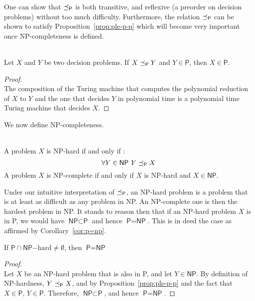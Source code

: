 One can show that \(\preceq_\textsf{P}\) is both transitive, and reflexive (a preorder on decision problems) without too much difficulty. Furthermore, the relation \(\preceq_\textsf{P}\) can be shown to satisfy Proposition~\ref{prop:ple-p-p} which will become very important once \textsf{NP}-completeness is defined.
\begin{proposition}\ \\
    \label{prop:ple-p-p}
    Let \(X \) and \(Y \) be two decision problems. If \(X \preceq_\textsf{P} Y\) and \(Y \in \textsf{P}\), then \(X \in \textsf{P}\).
\end{proposition}
\begin{proof}\ \\
    The composition of the Turing machine that computes the polynomial reduction of \(X\) to \(Y\) and the one that decides \(Y\) in polynomial time is a polynomial time Turing machine that decides \(X\).
\end{proof}

We now define \textsf{NP}-completeness.
\begin{definition}\ \\
    A problem \(X\) is \textsf{NP}-hard if and only if :
    \[\forall Y \in \textsf{NP}\ Y \preceq_\textsf{P} X\]
    A problem \(X\) is \textsf{NP}-complete if and only if \(X\) is \textsf{NP}-hard and \(X\in\textsf{NP}\).
\end{definition}

Under our intuitive interpretation of \(\preceq_\textsf{P}\), an \textsf{NP}-hard problem is a problem that is at least as difficult as any problem in \textsf{NP}. An \textsf{NP}-complete one is then the hardest problem in \textsf{NP}. It stands to reason then that if an \textsf{NP}-hard problem \(X\) is in \textsf{P}, we would have \(\textsf{NP} \subset \textsf{P}\) and hence \(\textsf{P}= \textsf{NP}\). This is in deed the case as affirmed by Corollary~\ref{cor:p=np}.

\begin{corollary}
    \label{cor:p=np}
    If \(\textsf{P} \cap \textsf{NP}\mathrm{-hard} \neq \emptyset\), then \(\textsf{P}=\textsf{NP}\)
\end{corollary}

\begin{proof}\ \\
    Let \(X\) be an \textsf{NP}-hard problem that is also in \textsf{P}, and let \(Y\in\textsf{NP}\). By definition of \textsf{NP}-hardness, \(Y\preceq_\textsf{P} X\), and by Proposition~\ref{prop:ple-p-p} and the fact that \(X\in\textsf{P}\), \(Y\in\textsf{P}\).
    Therefore, \(\textsf{NP} \subset \textsf{P}\), and hence \(\textsf{P}=\textsf{NP}\).
\end{proof}

